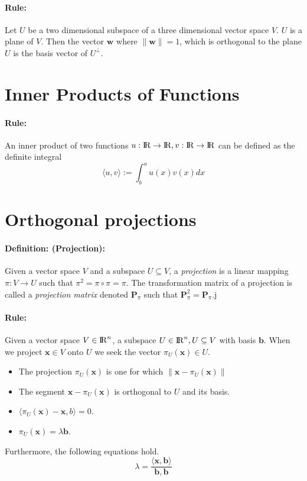 \documentclass[12pt]{article}
\newcommand{\R}{{\rm I\!R}}
\newcommand{\Rn}{{\R^n}}
\newcommand{\bx}{{\bm{x}}}
\newcommand{\bb}{{\bm{b}}}
\newcommand{\0}[0]{\bm{0}}
\newcommand{\ipr}[1]{\langle #1 \rangle}
\newcommand{\norm}[1]{\lVert#1\rVert}
\newcommand{\xdefinition}[2]{\paragraph{\colorbox{#1!30}{\textbf{Definition:}} (#2):}}
\newcommand{\xrule}[1]{\paragraph{\colorbox{#1!30}{\textbf{Rule:}}}}
\begin{document}
\xrule{red} Let $U$ be a two dimensional subspace of a three dimensional vector space $V$. $U$ is a plane of $V$. Then the vector $\bm{w}$ where $\norm{\bm{w}} = 1$, which is orthogonal to the plane $U$ is the basis vector of $U^{\perp}$.

\section{Inner Products of Functions}

\xrule{red} An inner product of two functions $u : \R \rightarrow \R, v : \R \rightarrow \R$ can be defined as the definite integral
%
\begin{equation}
	\ipr{u, v} := \int_b^a u(x) v(x) dx
\end{equation}

\section{Orthogonal projections}

\xdefinition{red}{Projection} Given a vector space $V$ and a subspace $U \subseteq V$, a \textit{projection} is a linear mapping $\pi : V \rightarrow U$ such that $\pi^2 = \pi \circ \pi = \pi$.
%
The transformation matrix of a projection is called a \textit{projection matrix} denoted $\bm{P}_\pi$ such that $\bm{P}_\pi^2 = \bm{P}_\pi$.j

\xrule{red} Given a vector space $V \in \Rn$, a subspace $U \in \Rn, U \subseteq V$ with basis $\bb$. When we project $\bx \in V$ onto $U$ we seek the vector $\pi_U(\bx) \in U$.
%
\begin{itemize}
	\item The projection $\pi_U(\bx)$ is one for which $\norm{\bx - \pi_U(\bx)}$
	\item The segment $\bx - \pi_U(\bx)$ is orthogonal to $U$ and its basis.
	\item $\ipr{\pi_U(\bx) - \bx, b} = 0$.
	\item $\pi_U(\bx) = \lambda \bb$.
\end{itemize}
%
Furthermore, the following equations hold.
%
\begin{equation}
	\lambda = \frac{\ipr{\bx, \bb}}{\bb, \bb}
\end{equation}
%
\begin{equation}
	
\end{equation}
\end{document}
